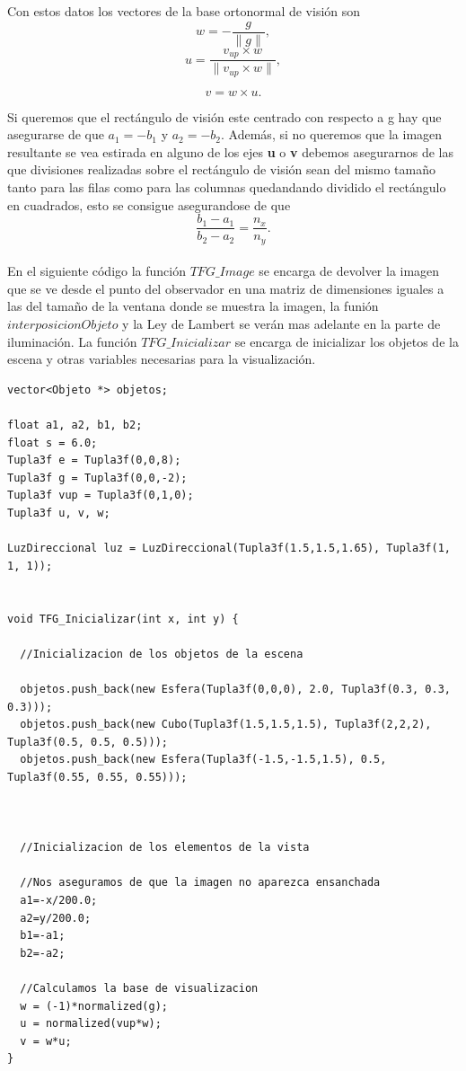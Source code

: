 Con estos datos los vectores de la base ortonormal de visión son
	\[
		w = - \frac{g}{\parallel g \parallel},
	\]
	\[
		u = \frac{v_{up} \times w}{\parallel v_{up} \times w \parallel},
	\]
	
	\[
		v = w \times u.
	\]
	
Si queremos que el rectángulo de visión este centrado con respecto a g hay que asegurarse de que $a_1 = -b_1$ y $a_2 = -b_2$. Además, si no queremos que la imagen resultante se vea estirada en alguno de los ejes \textbf{u} o \textbf{v} debemos asegurarnos de las que divisiones realizadas sobre el rectángulo de visión sean del mismo tamaño tanto para las filas como para las columnas quedandando dividido el rectángulo en cuadrados, esto se consigue asegurandose de que
	\[
		\frac{b_1-a_1}{b_2 - a_2} = \frac{n_x}{n_y}.
	\]
	${ }$\\

En el siguiente código la función $TFG\_Image$ se encarga de devolver la imagen que se ve desde el punto del observador en una matriz de dimensiones iguales a las del tamaño de la ventana donde se muestra la imagen, la funión $interposicionObjeto$ y la Ley de Lambert se verán mas adelante en la parte de iluminación. La función $TFG\_Inicializar$ se encarga de inicializar los objetos de la escena y otras variables necesarias para la visualización.
\begin{lstlisting}[style=Consola]
vector<Objeto *> objetos;

float a1, a2, b1, b2;
float s = 6.0;
Tupla3f e = Tupla3f(0,0,8);
Tupla3f g = Tupla3f(0,0,-2);
Tupla3f vup = Tupla3f(0,1,0);
Tupla3f u, v, w;

LuzDireccional luz = LuzDireccional(Tupla3f(1.5,1.5,1.65), Tupla3f(1, 1, 1));


void TFG_Inicializar(int x, int y) {

  //Inicializacion de los objetos de la escena

  objetos.push_back(new Esfera(Tupla3f(0,0,0), 2.0, Tupla3f(0.3, 0.3, 0.3)));
  objetos.push_back(new Cubo(Tupla3f(1.5,1.5,1.5), Tupla3f(2,2,2), Tupla3f(0.5, 0.5, 0.5)));
  objetos.push_back(new Esfera(Tupla3f(-1.5,-1.5,1.5), 0.5, Tupla3f(0.55, 0.55, 0.55)));



  //Inicializacion de los elementos de la vista

  //Nos aseguramos de que la imagen no aparezca ensanchada
  a1=-x/200.0;
  a2=y/200.0;
  b1=-a1;
  b2=-a2;

  //Calculamos la base de visualizacion
  w = (-1)*normalized(g);
  u = normalized(vup*w);
  v = w*u;
}
\end{lstlisting}



